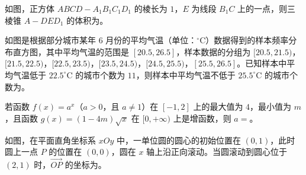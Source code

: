 \Needspace{0.4\textheight}
\begin{question}
如图，正方体 $ABCD-A_1B_1C_1D_1$ 的棱长为 $1$，$E$ 为线段 $B_1C$ 上的一点，则三棱锥 $A-DED_1$ 的体积为\gkblank{}。
\nopagebreak[4]
\begin{center}\end{center}
\nopagebreak[4]
\Needspace{0.4\textheight}
\end{question}
\begin{question}
如图是根据部分城市某年 $6$ 月份的平均气温（单位：$^\circ\mathrm C$）数据得到的样本频率分布直方图，其中平均气温的范围是 $[20.5,26.5]$，样本数据的分组为 $[20.5,21.5)$，$[21.5,22.5)$，$[22.5,23.5)$，$[23.5,24.5)$，$[24.5,25.5)$，$[25.5,26.5]$。已知样本中平均气温低于 $22.5^\circ\mathrm C$ 的城市个数为 $11$，则样本中平均气温不低于 $25.5^\circ\mathrm C$ 的城市个数为\gkblank{}。
\nopagebreak[4]
\begin{center}\end{center}
\nopagebreak[4]
\end{question}
\begin{question}
若函数 $f(x)=a^x$（$a>0$，且 $a\neq1$）在 $[-1,2]$ 上的最大值为 $4$，最小值为 $m$，且函数 $g(x)=(1-4m)\sqrt x$ 在 $[0,+\infty)$ 上是增函数，则 $a=$\gkblank{}。

\Needspace{0.4\textheight}
\end{question}
\begin{question}
如图，在平面直角坐标系 $xOy$ 中，一单位圆的圆心的初始位置在 $(0,1)$，此时圆上一点 $P$ 的位置在 $(0,0)$，圆在 $x$ 轴上沿正向滚动。当圆滚动到圆心位于 $(2,1)$ 时，$\overrightarrow{OP}$ 的坐标为\gkblank{}。
\nopagebreak[4]
\begin{center}\end{center}
\nopagebreak[4]
\end{question}

